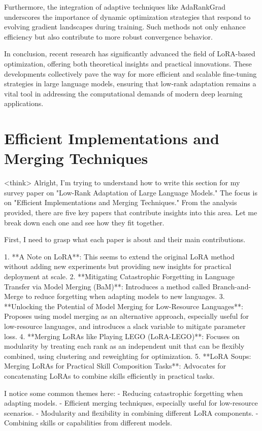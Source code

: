 \documentclass[conference]{IEEEtran}
\begin{document}
Furthermore, the integration of adaptive techniques like AdaRankGrad underscores the importance of dynamic optimization strategies that respond to evolving gradient landscapes during training. Such methods not only enhance efficiency but also contribute to more robust convergence behavior.

In conclusion, recent research has significantly advanced the field of LoRA-based optimization, offering both theoretical insights and practical innovations. These developments collectively pave the way for more efficient and scalable fine-tuning strategies in large language models, ensuring that low-rank adaptation remains a vital tool in addressing the computational demands of modern deep learning applications.

\section{Efficient Implementations and Merging Techniques}
<think>
Alright, I'm trying to understand how to write this section for my survey paper on "Low-Rank Adaptation of Large Language Models." The focus is on "Efficient Implementations and Merging Techniques." From the analysis provided, there are five key papers that contribute insights into this area. Let me break down each one and see how they fit together.

First, I need to grasp what each paper is about and their main contributions. 

1. **A Note on LoRA**: This seems to extend the original LoRA method without adding new experiments but providing new insights for practical deployment at scale.
2. **Mitigating Catastrophic Forgetting in Language Transfer via Model Merging (BaM)**: Introduces a method called Branch-and-Merge to reduce forgetting when adapting models to new languages.
3. **Unlocking the Potential of Model Merging for Low-Resource Languages**: Proposes using model merging as an alternative approach, especially useful for low-resource languages, and introduces a slack variable to mitigate parameter loss.
4. **Merging LoRAs like Playing LEGO (LoRA-LEGO)**: Focuses on modularity by treating each rank as an independent unit that can be flexibly combined, using clustering and reweighting for optimization.
5. **LoRA Soups: Merging LoRAs for Practical Skill Composition Tasks**: Advocates for concatenating LoRAs to combine skills efficiently in practical tasks.

I notice some common themes here:
- Reducing catastrophic forgetting when adapting models.
- Efficient merging techniques, especially useful for low-resource scenarios.
- Modularity and flexibility in combining different LoRA components.
- Combining skills or capabilities from different models.
\end{document}
